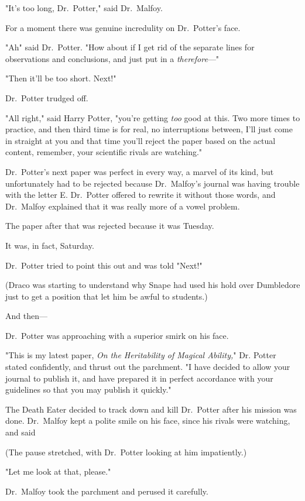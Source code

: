 "It's too long, Dr.~Potter," said Dr.~Malfoy.

For a moment there was genuine incredulity on Dr.~Potter's face.

"Ah{\el}" said Dr.~Potter. "How about if I get rid of the separate lines for
observations and conclusions, and just put in a \emph{therefore}\mbox{---}"

"Then it'll be too short. Next!"

Dr.~Potter trudged off.

"All right," said Harry Potter, "you're getting \emph{too} good at this. Two
more times to practice, and then third time is for real, no interruptions
between, I'll just come in straight at you and that time you'll reject the
paper based on the actual content, remember, your scientific rivals are
watching."

Dr.~Potter's next paper was perfect in every way, a marvel of its kind, but
unfortunately had to be rejected because Dr.~Malfoy's journal was having
trouble with the letter E. Dr.~Potter offered to rewrite it without those
words, and Dr.~Malfoy explained that it was really more of a vowel problem.

The paper after that was rejected because it was Tuesday.

It was, in fact, Saturday.

Dr.~Potter tried to point this out and was told "Next!"

(Draco was starting to understand why Snape had used his hold over Dumbledore
just to get a position that let him be awful to students.)

And then---

Dr.~Potter was approaching with a superior smirk on his face.

"This is my latest paper, \emph{On the Heritability of Magical Ability,}" Dr.
Potter stated confidently, and thrust out the parchment. "I have decided to
allow your journal to publish it, and have prepared it in perfect accordance
with your guidelines so that you may publish it quickly."

The Death Eater decided to track down and kill Dr.~Potter after his mission was
done. Dr.~Malfoy kept a polite smile on his face, since his rivals were
watching, and said{\el}

(The pause stretched, with Dr.~Potter looking at him impatiently.)

{\el} "Let me look at that, please."

Dr.~Malfoy took the parchment and perused it carefully.

